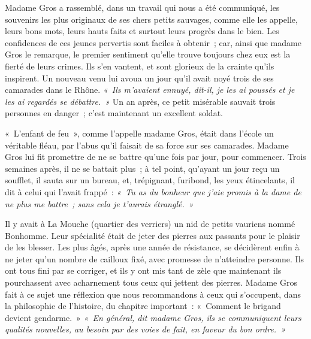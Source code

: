 \documentclass[french,twoside]{book} %
\newcommand\persName[1]{#1}
\newcommand\placeName[1]{#1}
\begin{document}
{\persName Madame Gros} a rassemblé, dans un travail qui nous a été communiqué, les souvenirs les plus originaux de ses chers petits sauvages, comme elle les appelle, leurs bons mots, leurs hauts faits et surtout leurs progrès dans le bien. Les confidences de ces jeunes pervertis sont faciles à obtenir ; car, ainsi que {\persName madame Gros} le remarque, le premier sentiment qu’elle trouve toujours chez eux est la fierté de leurs crimes. Ils s’en vantent, et sont glorieux de la crainte qu’ils inspirent. Un nouveau venu lui avoua un jour qu’il avait noyé trois de ses camarades dans le {\placeName Rhône}. \emph{« Ils m’avaient ennuyé, dit-il, je les ai poussés et je les ai regardés se débattre. »} Un an après, ce petit misérable sauvait trois personnes en danger ; c’est maintenant un excellent soldat.\par
« L’enfant de feu », comme l’appelle {\persName madame Gros}, était dans l’école un véritable fléau, par l’abus qu’il faisait de sa force sur ses camarades. {\persName Madame Gros} lui fit promettre de ne se battre qu’une fois par jour, pour commencer. Trois semaines après, il ne se battait plus ; à tel point, qu’ayant un jour reçu un soufflet, il sauta sur un bureau, et, trépignant, furibond, les yeux étincelants, il dit à celui qui l’avait frappé : \emph{« Tu as du bonheur que j’aie promis à la dame de ne plus me battre ; sans cela je t’aurais étranglé. »}\par
Il y avait à {\placeName La Mouche} (quartier des verriers) un nid de petits vauriens nommé {\persName Bonhomme}. Leur spécialité était de jeter des pierres aux passants pour le plaisir de les blesser. Les plus âgés, après une année de résistance, se décidèrent enfin à ne jeter qu’un nombre de cailloux fixé, avec promesse de n’atteindre personne. Ils ont tous fini par se corriger, et ils y ont mis tant de zèle que maintenant ils pourchassent avec acharnement tous ceux qui jettent des pierres. {\persName Madame Gros} fait à ce sujet une réflexion que nous recommandons à ceux qui s’occupent, dans la philosophie de l’histoire, du chapitre important : « Comment le brigand devient gendarme. » \emph{« En général, dit {\persName madame Gros}, ils se communiquent leurs qualités nouvelles, au besoin par des voies de fait, en faveur du bon ordre. »}\par
\end{document}
